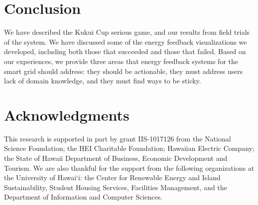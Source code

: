 \documentclass[10pt, conference, compsocconf]{IEEEtran}
\begin{document}
\section{Conclusion}

We have described the Kukui Cup serious game, and our results from field trials of the system. We have discussed some of the energy feedback visualizations we developed, including both those that succeeded and those that failed. Based on our experiences, we provide three areas that energy feedback systems for the smart grid should address: they should be actionable, they must address users lack of domain knowledge, and they must find ways to be sticky.


\section*{Acknowledgments}

This research is supported in part by grant IIS-1017126 from the National Science Foundation; the HEI Charitable Foundation; Hawaiian Electric Company; the State of Hawaii Department of Business, Economic Development and Tourism. We are also thankful for the support from the following organizations at the University of Hawai`i: the Center for Renewable Energy and Island Sustainability, Student Housing Services, Facilities Management, and the Department of Information and Computer Sciences.


%
%
\end{document}
